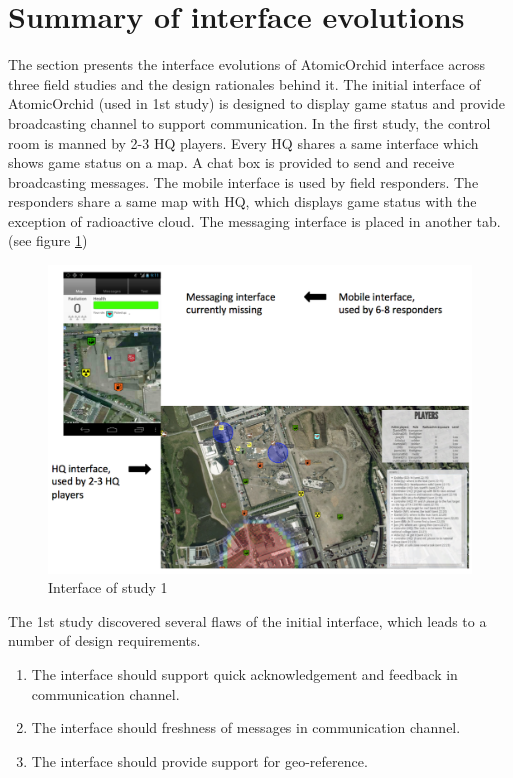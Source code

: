 \section{Summary of interface evolutions}\label{sec:conclusionIE}
The section presents the interface evolutions of AtomicOrchid interface across three field studies and the design rationales behind it. The initial interface of AtomicOrchid (used in 1st study) is designed to display game status and provide broadcasting channel to support communication. In the first study, the control room is manned by 2-3 HQ players. Every HQ shares a same interface which shows game status on a map. A chat box is provided to send and receive broadcasting messages. The mobile interface is used by field responders. The responders share a same map with HQ, which displays game status with the exception of radioactive cloud. The messaging interface is placed in another tab.(see figure \ref{fig:study1interface})\\ 

\begin{figure}[H]
  \centering
  \includegraphics[width=1\textwidth]{img/conclusion/study1interface}
  \caption{Interface of study 1}
  \label{fig:study1interface}
\end{figure}


The 1st study discovered several flaws of the initial interface, which leads to a number of design requirements. 

\begin{enumerate}
	 \item The interface should support quick acknowledgement and feedback in communication channel.
	 \item The interface should freshness of messages in communication channel.
	 \item The interface should provide support for geo-reference.
\end{enumerate}

